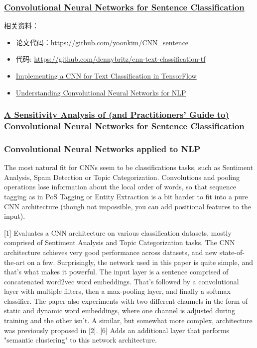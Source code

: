 \documentclass[UTF8,11pt,a4paper]{ctexart}
\begin{document}
\subsubsection{\href{https://arxiv.org/abs/1408.5882}{Convolutional Neural Networks for Sentence Classification}}

相关资料：
\begin{itemize}
\item 论文代码：\url{https://github.com/yoonkim/CNN_sentence}
\item 代码: \url{https://github.com/dennybritz/cnn-text-classification-tf}
\item \href{http://www.wildml.com/2015/12/implementing-a-cnn-for-text-classification-in-tensorflow/}{Implementing a CNN for Text Classification in TensorFlow}
\item \href{http://www.wildml.com/2015/11/understanding-convolutional-neural-networks-for-nlp/}{Understanding Convolutional Neural Networks for NLP}
\end{itemize}

\subsubsection{\href{https://arxiv.org/abs/1510.03820}{A Sensitivity Analysis of (and Practitioners’ Guide to) Convolutional Neural Networks for Sentence Classification}}

\subsubsection{Convolutional Neural Networks applied to NLP}

The most natural fit for CNNs seem to be classifications tasks, such as Sentiment Analysis, Spam Detection or Topic Categorization. Convolutions and pooling operations lose information about the local order of words, so that sequence tagging as in PoS Tagging or Entity Extraction is a bit harder to fit into a pure CNN architecture (though not impossible, you can add positional features to the input).

[1] Evaluates a CNN architecture on various classification datasets, mostly comprised of Sentiment Analysis and Topic Categorization tasks. The CNN architecture achieves very good performance across datasets, and new state-of-the-art on a few. Surprisingly, the network used in this paper is quite simple, and that's what makes it powerful. The input layer is a sentence comprised of concatenated word2vec word embeddings. That's followed by a convolutional layer with multiple filters, then a max-pooling layer, and finally a softmax classifier. The paper also experiments with two different channels in the form of static and dynamic word embeddings, where one channel is adjusted during training and the other isn't. A similar, but somewhat more complex, architecture was previously proposed in [2]. [6] Adds an additional layer that performs "semantic clustering" to this network architecture.
\end{document}
